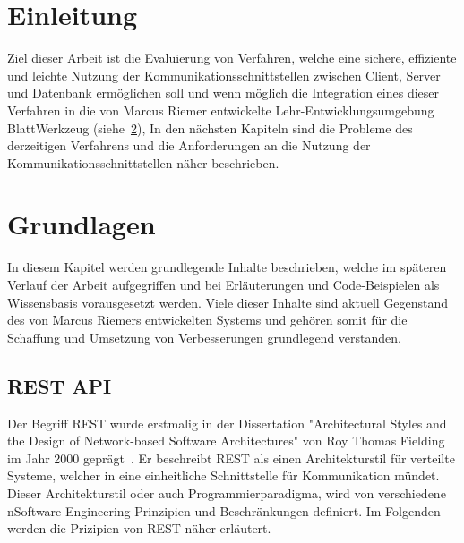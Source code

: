 
\chapter{Einleitung}
\label{sec:requirements}

Ziel dieser Arbeit ist die Evaluierung von Verfahren, welche eine sichere, effiziente und leichte Nutzung der Kommunikationsschnittstellen 
zwischen Client, Server und Datenbank ermöglichen soll und wenn möglich die Integration eines dieser Verfahren
in die von Marcus Riemer entwickelte Lehr-Entwicklungsumgebung BlattWerkzeug (siehe~\ref{sec:basics}),
In den nächsten Kapiteln sind die Probleme des derzeitigen Verfahrens und die Anforderungen an die Nutzung der Kommunikationsschnittstellen näher beschrieben.

\chapter{Grundlagen}
\label{sec:basics}
In diesem Kapitel werden grundlegende Inhalte beschrieben, welche im späteren Verlauf der Arbeit aufgegriffen 
und bei Erläuterungen und Code-Beispielen als Wissensbasis vorausgesetzt werden. Viele dieser Inhalte sind aktuell Gegenstand
des von Marcus Riemers entwickelten Systems und gehören somit für die Schaffung und Umsetzung von Verbesserungen grundlegend verstanden.
\section{REST API}
\label{sec:basics:restapi}
Der Begriff REST wurde erstmalig in der Dissertation "Architectural Styles and the Design of 
Network-based Software Architectures" von Roy Thomas Fielding im Jahr 2000 geprägt~\cite{fielding-dissertation}.
Er beschreibt REST als einen Architekturstil für verteilte Systeme, welcher in eine einheitliche Schnittstelle für Kommunikation mündet.
Dieser Architekturstil oder auch Programmierparadigma, wird von verschiedene nSoftware-Engineering-Prinzipien und Beschränkungen definiert.
Im Folgenden werden die Prizipien von REST näher erläutert.

